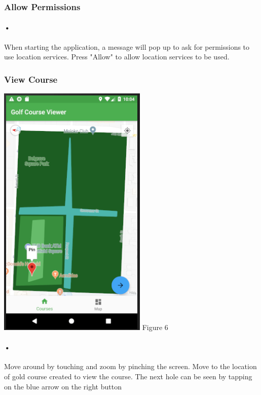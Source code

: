 \documentclass{article}
\begin{document}
	\subsubsection{Allow Permissions}
	
	\paragraph{•}
	When starting the application, a message will pop up to ask for permissions to use location services. Press "Allow" to allow location services to be used.
	
	\subsubsection{View Course}
	    \includegraphics[scale=0.8]{coursemap.png}
	    Figure 6
	
	\paragraph{•}
	Move around by touching and zoom by pinching the screen. Move to the location of gold course created to view the course. The next hole can be seen by tapping on the blue arrow on the right button
	
\end{document}
